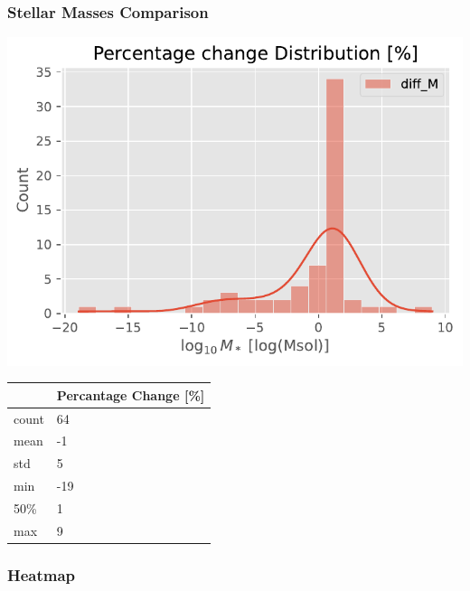 \documentclass[
]{article}
\begin{document}
\subsubsection{Stellar Masses Comparison}

\includegraphics{compare_files/figure-pdf/cell-46-output-1.pdf}

\begin{longtable}[]{@{}ll@{}}
\toprule\noalign{}
& Percantage Change {[}\%{]} \\
\midrule\noalign{}
\endhead
\bottomrule\noalign{}
\endlastfoot
count & 64 \\
mean & -1 \\
std & 5 \\
min & -19 \\
50\% & 1 \\
max & 9 \\
\end{longtable}

\subsubsection{Heatmap}
\end{document}
